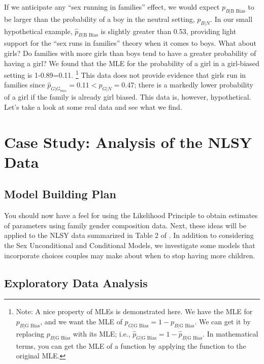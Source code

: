 \documentclass[
]{krantz}
\newcommand{\neutral}{p_{B|N}}
\newcommand{\gbias}{p_{B|\textrm{G Bias}}}
\begin{document}
If we anticipate any ``sex running in families'' effect, we would expect \(p_{B|\textrm{B Bias}}\) to be larger than the probability of a boy in the neutral setting, \(\neutral\). In our small hypothetical example, \(\hat{p}_{B|\textrm{B Bias}}\) is slightly greater than 0.53, providing light support for the ``sex runs in families'' theory when it comes to boys. What about girls? Do families with more girls than boys tend to have a greater probability of having a girl? We found that the MLE for the probability of a girl in a girl-biased setting is 1-0.89=0.11. \footnote{Note: A nice property of MLEs is demonstrated here. We have the MLE for \(\gbias\), and we want the MLE of \(p_{G|\textrm{G Bias}}=1-\gbias\). We can get it by replacing \(\gbias\) with its MLE; i.e., \(\hat{p}_{G|\textrm{G Bias}}=1-\hat{p}_{B|\textrm{G Bias}}\). In mathematical terms, you can get the MLE of a function by applying the function to the original MLE.} This data does not provide evidence that girls run in families since \(\hat{p}_{G|G_{bias}} = 0.11 < \hat{p}_{G|N}=0.47\); there is a markedly lower probability of a girl if the family is already girl biased. This data is, however, hypothetical. Let's take a look at some real data and see what we find.

\hypertarget{case-study-analysis-of-the-nlsy-data}{%
\section{Case Study: Analysis of the NLSY Data}\label{case-study-analysis-of-the-nlsy-data}}

\hypertarget{model-building-plan}{%
\subsection{Model Building Plan}\label{model-building-plan}}

You should now have a feel for using the Likelihood Principle to obtain estimates of parameters using family gender composition data. Next, these ideas will be applied to the NLSY data summarized in Table 2 of \citep{Rodgers2001}. In addition to considering the Sex Unconditional and Conditional Models, we investigate some models that incorporate choices couples may make about when to stop having more children.

\hypertarget{EDA.sec}{%
\subsection{Exploratory Data Analysis}\label{EDA.sec}}
\end{document}

